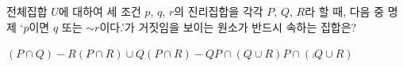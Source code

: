 전체집합 $U$에 대하여 세 조건 $p$, $q$, $r$의 진리집합을 각각 $P$, $Q$, $R$라 할 때, 다음 중 명제 ‘$p$이면 $q$ 또는 ${\sim} r$이다.’가 거짓임을 보이는 원소가 반드시 속하는 집합은?
\begin{choicesii}{$(P\cap Q)-R$}{$(P\cap R)\cup Q$}{$(P\cap R)-Q$}{$P\cap(Q\cup R)$}{$P\cap(\comp{Q}\cup R)$}\end{choicesii}
